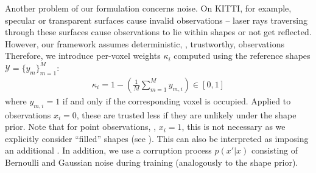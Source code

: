 %
Another problem of our \AML formulation concerns noise. On KITTI, for example, specular or transparent surfaces cause invalid observations -- laser rays traversing through these surfaces cause observations to lie within shapes or not get reflected. However, our \AML framework assumes deterministic, \ie, trustworthy, observations  Therefore, we introduce per-voxel weights $\kappa_i$ computed using the reference shapes $\mathcal{Y} = \{y_m\}_{m=1}^M$:
%
\begin{align}
\kappa_i = 1 - \left(\frac{1}{M} \sum_{m = 1}^M y_{m,i}\right) \in [0,1]
\end{align}
%
where $y_{m,i} = 1$ if and only if the corresponding voxel is occupied. Applied to observations $x_i = 0$, these are trusted less if they are unlikely under the shape prior. Note that for point observations, \ie, $x_i = 1$, this is not necessary as we explicitly consider ``filled'' shapes (see ). This can also be interpreted as imposing an additional . In addition, we use a corruption process $p(x' | x)$ consisting of Bernoulli and Gaussian noise during training (analogously to the \DVAE shape prior).
